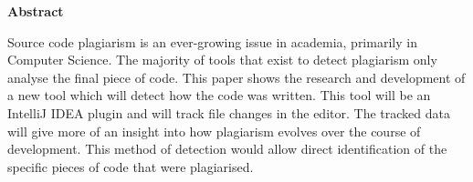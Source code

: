 \thispagestyle{empty}


\begin{center}
    {\LARGE\bf Abstract}
\end{center}

Source code plagiarism is an ever-growing issue in academia, primarily in Computer Science. The majority of tools that exist to detect plagiarism only analyse the final piece of code. This paper shows the research and development of a new tool which will detect how the code was written. This tool will be an IntelliJ IDEA plugin and will track file changes in the editor. The tracked data will give more of an insight into how plagiarism evolves over the course of development. This method of detection would allow direct identification of the specific pieces of code that were plagiarised.

